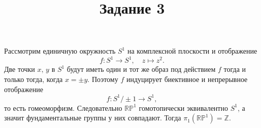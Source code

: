 \documentclass[a4paper]{article}
\title{Задание 3}
\begin{document}
	\maketitle
{}
Рассмотрим единичную окружность $S^1$ на комплексной плоскости и отображение
\[
f\colon S^1 \to S^1,\quad z \mapsto z^2
.\] 
Две точки $x,\,y$ в $S^1$ будут иметь один и тот же образ под
действием $f$ тогда и только тогда, когда $x=\pm y$. Поэтому
 $f$ индуцирует биективное и непрерывное отображение
 \[
 f\colon  S^1/ \pm 1 \to S^1
 ,\] 
 то есть гомеоморфизм. Следовательно $\mathbb{R}\mathbb{P}^1$
 гомотопически эквивалентно $S^1$, а значит фундаментальные
 группы у них совпадают. Тогда $\pi_1(\mathbb{R}\mathbb{P}^1)
 =\mathbb{Z}$.
\end{document}
